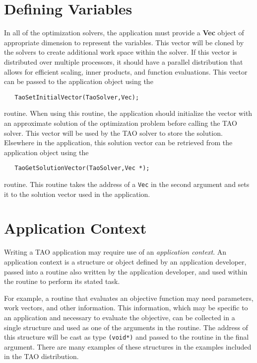 \section{Defining Variables}
In all of the optimization solvers, the application must provide
a {\bf Vec} object of appropriate dimension to represent the variables.
This vector will be cloned by the solvers to create additional work
space within the solver.
If this vector is distributed over multiple processors, it
should have a parallel distribution that allows
for efficient scaling, inner products, and
function evaluations.  This vector can be passed to the
application object using the  
\begin{verbatim}
   TaoSetInitialVector(TaoSolver,Vec);
\end{verbatim}
routine. 
When using this routine, the application should initialize the vector with
an approximate solution of the optimization problem before calling the
TAO solver.
This vector will be used by the TAO solver to store the solution.
Elsewhere in the application, 
this solution vector can be retrieved from the application object 
using the  
\begin{verbatim}
   TaoGetSolutionVector(TaoSolver,Vec *);
\end{verbatim}
routine. 
This routine takes the address of a {\tt Vec} in the second argument and sets it to
the solution vector used in the application.

\section{Application Context}  
Writing a TAO application may require
use of an {\em application context}.
An application context is a structure or object defined by an
application developer, passed
into a routine also written by the application developer, 
and used within the routine to perform its stated task.
 
For example, a routine that evaluates an objective function may need
parameters, work vectors, and other information.   This information,
which may be specific to an application and necessary to evaluate the objective,
can be collected in a single structure and used as one of the
arguments in the routine.
The address of this structure will be cast as type {\tt (void*)} and passed to
the routine in the final argument.
There are many examples of these structures in the examples included in the
TAO distribution.

